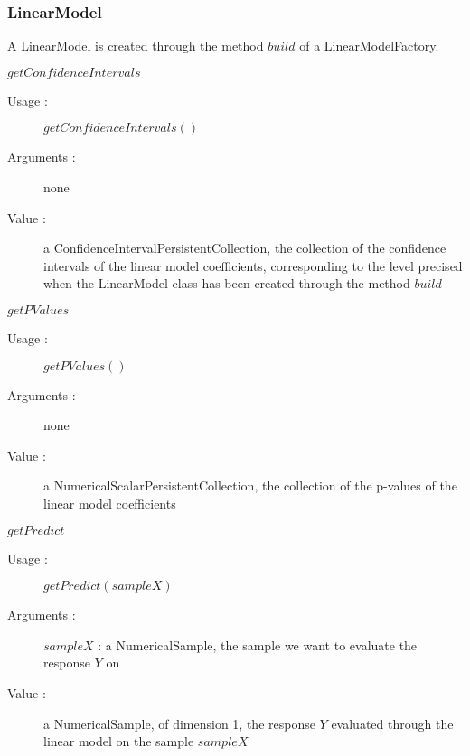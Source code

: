 \newpage   \subsubsection{LinearModel}



\begin{description}
\item[Usage :] A LinearModel is created through the method $build$ of a LinearModelFactory.
\item[Some methods :]  \rule{0pt}{1em}

  \begin{description}

  \item $getConfidenceIntervals$
    \begin{description}
    \item[Usage :] $getConfidenceIntervals()$
    \item[Arguments :] none
    \item[Value :] a ConfidenceIntervalPersistentCollection, the collection  of the confidence intervals of the linear model coefficients, corresponding to the level precised when the LinearModel class has been created through the method $build$

    \end{description}
    \bigskip

  \item $getPValues$
    \begin{description}
    \item[Usage :] $getPValues()$
    \item[Arguments :] none
    \item[Value :] a NumericalScalarPersistentCollection, the collection  of the p-values of the linear model coefficients
    \end{description}
    \bigskip

  \item $getPredict$
    \begin{description}
    \item[Usage :] $getPredict(sampleX)$
    \item[Arguments :] $sampleX$ : a NumericalSample, the sample we want to evaluate the response $Y$ on
    \item[Value :] a NumericalSample, of dimension 1, the response $Y$ evaluated through the linear model on the sample $sampleX$
    \end{description}
    \bigskip


\end{description}
\end{description}
